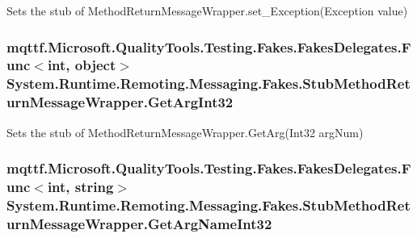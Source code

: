 Sets the stub of Method\-Return\-Message\-Wrapper.\-set\-\_\-\-Exception(\-Exception value)

\hypertarget{class_system_1_1_runtime_1_1_remoting_1_1_messaging_1_1_fakes_1_1_stub_method_return_message_wrapper_a1e76f1b1c9f3cff3a2401c281ead57b0}{
\subsubsection[{Get\-Arg\-Int32}]{\setlength{\rightskip}{0pt plus 5cm}mqttf.\-Microsoft.\-Quality\-Tools.\-Testing.\-Fakes.\-Fakes\-Delegates.\-Func$<$int, object$>$ System.\-Runtime.\-Remoting.\-Messaging.\-Fakes.\-Stub\-Method\-Return\-Message\-Wrapper.\-Get\-Arg\-Int32}}\label{class_system_1_1_runtime_1_1_remoting_1_1_messaging_1_1_fakes_1_1_stub_method_return_message_wrapper_a1e76f1b1c9f3cff3a2401c281ead57b0}


Sets the stub of Method\-Return\-Message\-Wrapper.\-Get\-Arg(\-Int32 arg\-Num)

\hypertarget{class_system_1_1_runtime_1_1_remoting_1_1_messaging_1_1_fakes_1_1_stub_method_return_message_wrapper_a31de97c8261a350c44035e27fab2d188}{
\subsubsection[{Get\-Arg\-Name\-Int32}]{\setlength{\rightskip}{0pt plus 5cm}mqttf.\-Microsoft.\-Quality\-Tools.\-Testing.\-Fakes.\-Fakes\-Delegates.\-Func$<$int, string$>$ System.\-Runtime.\-Remoting.\-Messaging.\-Fakes.\-Stub\-Method\-Return\-Message\-Wrapper.\-Get\-Arg\-Name\-Int32}}\label{class_system_1_1_runtime_1_1_remoting_1_1_messaging_1_1_fakes_1_1_stub_method_return_message_wrapper_a31de97c8261a350c44035e27fab2d188}


